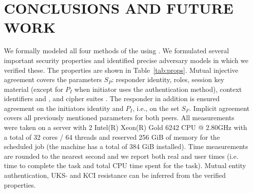 \documentclass[runningheads]{llncs}
\begin{document}
\section{\uppercase{Conclusions and Future Work}}
\label{sec:conclusions}
\label{sec:newdrafts}
We formally modeled all four
methods of the \mEdhoc{} \mSpec{} using \mTamarin.
%
We formulated several important security properties and identified precise
adversary models in which we verified these.
%
The properties are shown in Table~\ref{tab:props}.
%
Mutual injective agreement covers the parameters $S_P$:
responder identity, roles, session key material (except for $P_I$ when
initiator uses the \mStat{} authentication
method), context identifiers \mCi{} and \mCr, and cipher suites \mSuites.
%
The responder in addition is ensured agreement on the initiators identity and
$P_I$, i.e., on the set $S_F$.
%
Implicit agreement covers all previously mentioned parameters for both peers.
%
All measurements were taken on a server with 2 Intel(R) Xeon(R) Gold
6242 CPU @ 2.80GHz with a total of 32 cores / 64 threads and reserved
256 GiB of memory for the scheduled job (the machine has a total of
384 GiB installed).
%
Time measurements are rounded to the nearest second and we report both
real and user times (i.e. time to complete the task and total CPU time
spent for the task).
%
Mutual entity authentication, UKS- and KCI resistance can be inferred
from the verified properties.
%
\end{document}
